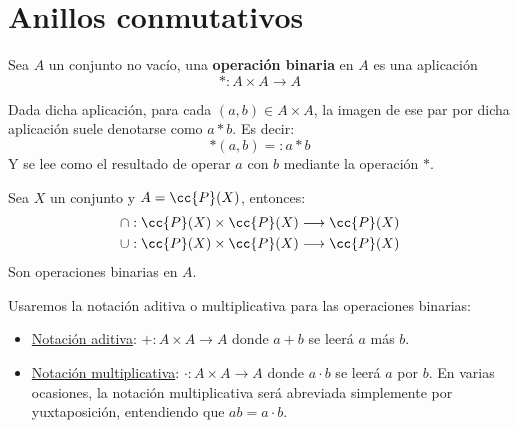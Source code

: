 \chapter{Anillos conmutativos}

\begin{definicion}
    Sea $A$ un conjunto no vacío, una \textbf{operación binaria} en $A$ es una aplicación $$\ast:A\times A \longrightarrow A$$
\end{definicion}

Dada dicha aplicación, para cada $(a,b) \in A \times A$, la imagen de ese par por dicha aplicación suele denotarse como $a * b$.
Es decir:
$$\ast(a,b) =: a \ast b$$
Y se lee como el resultado de operar $a$ con $b$ mediante la operación $*$.

\begin{ejemplo}
    Sea $X$ un conjunto y $A = \cc{P}(X)$, entonces:
    \begin{gather*}
        \cap:\cc{P}(X)\times \cc{P}(X)\longrightarrow \cc{P}(X) \\
        \cup:\cc{P}(X)\times \cc{P}(X)\longrightarrow \cc{P}(X)
    \end{gather*}
    Son operaciones binarias en $A$.
\end{ejemplo}


Usaremos la notación aditiva o multiplicativa para las operaciones binarias:
\begin{itemize}
    \item \underline{Notación aditiva}: $+:A\times A\longrightarrow A$ donde $a + b$ se leerá $a$ más $b$.
    \item \underline{Notación multiplicativa}: $\cdot:A\times A\longrightarrow A$ donde $a \cdot b$ se leerá $a$ por $b$.
        En varias ocasiones, la notación multiplicativa será abreviada simplemente por yuxtaposición, entendiendo que $ab = a\cdot b$.
\end{itemize}

